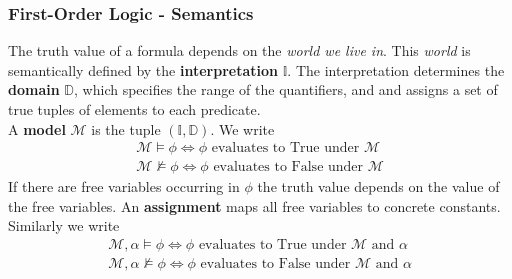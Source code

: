 \subsubsection{First-Order Logic - Semantics}
The truth value of a formula depends on the \textit{world we live in}. This \textit{world} is semantically defined by the \textbf{interpretation} $\mathbb{I}$. The interpretation determines the \textbf{domain} $\mathbb{D}$, which specifies the range of the quantifiers, and and assigns a set of true tuples of elements to each predicate. \\
A \textbf{model} $\mathcal{M}$ is the tuple $(\mathbb{I}, \mathbb{D}).$ We write
\begin{align*}
\mathcal{M} \models \phi \iff \phi \text{ evaluates to True under } \mathcal{M} \\
\mathcal{M} \not\models \phi \iff \phi \text{ evaluates to False under } \mathcal{M}
\end{align*}
If there are free variables occurring in $\phi$ the truth value depends on the value of the free variables. An \textbf{assignment} maps all free variables to concrete constants. Similarly we write
\begin{align*}
\mathcal{M}, \alpha \models \phi \iff \phi \text{ evaluates to True under } \mathcal{M} \text{ and } \alpha \\
\mathcal{M}, \alpha \not\models \phi \iff \phi \text{ evaluates to False under } \mathcal{M} \text{ and } \alpha
\end{align*}

